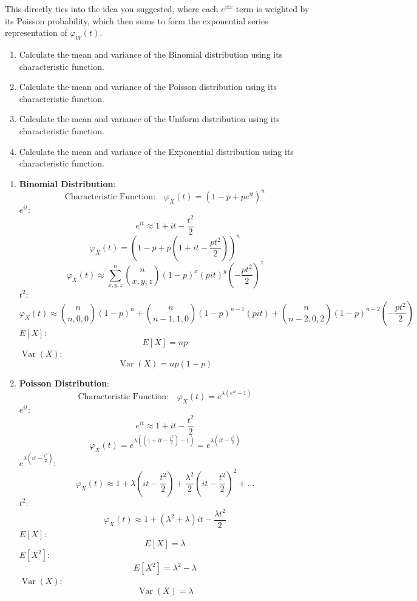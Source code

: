 \begin{enumerate}[label=(\alph*)]
This directly ties into the idea you suggested, where each \( e^{itx} \) term is weighted by its Poisson probability, which then sums to form the exponential series representation of \( \varphi_{W}(t) \).




\exercise
\exercise
\begin{enumerate}[label=(\alph*)]
    \item Calculate the mean and variance of the Binomial distribution using its characteristic function.
    \item Calculate the mean and variance of the Poisson distribution using its characteristic function.
    \item Calculate the mean and variance of the Uniform distribution using its characteristic function.
    \item Calculate the mean and variance of the Exponential distribution using its characteristic function.
\end{enumerate}

\solution
\begin{enumerate}[label=(\alph*)]
    \item
    \textbf{Binomial Distribution}:
    \[
    \text{Characteristic Function:} \quad \varphi_X(t) = (1-p + pe^{it})^n
    \]
     \( e^{it} \):
    \[
    e^{it} \approx 1 + it - \frac{t^2}{2}
    \]
    \[
    \varphi_X(t) = (1-p + p(1 + it - \frac{pt^2}{2}))^n
    \]
    \[
    \varphi_X(t) \approx \sum_{x,y,z}^n \binom{n}{x,y,z} (1-p)^x \left(pit\right)^y \left(-\frac{pt^2}{2}\right)^{z}
    \]
     \( t^2 \):
    \[
    \varphi_X(t) \approx \binom{n}{n,0,0}(1-p)^n + \binom{n}{n-1,1,0}(1-p)^{n-1}(pit) + \binom{n}{n-2,0,2}(1-p)^{n-2}\left(-\frac{pt^2}{2}\right)
    \]
     \( E[X] \):
    \[
    E[X] = np
    \]
     \( \operatorname{Var}(X) \):
    \[
    \operatorname{Var}(X) = np(1-p)
    \]

    \item
\textbf{Poisson Distribution}:
\[
\text{Characteristic Function:} \quad \varphi_X(t) = e^{\lambda (e^{it} - 1)}
\]
 \( e^{it} \):
\[
e^{it} \approx 1 + it - \frac{t^2}{2}
\]
\[
\varphi_X(t) = e^{\lambda \left((1 + it - \frac{t^2}{2}) - 1\right)} = e^{\lambda (it - \frac{t^2}{2})}
\]
 \( e^{\lambda (it - \frac{t^2}{2})} \):
\[
\varphi_X(t) \approx 1 + \lambda (it - \frac{t^2}{2}) + \frac{\lambda^2}{2} (it - \frac{t^2}{2})^2 + \ldots
\]
 \( t^2 \):
\[
\varphi_X(t) \approx 1 + (\lambda^2 + \lambda) it - \frac{\lambda t^2}{2}
\]
 \( E[X] \):
\[
E[X] = \lambda
\]
 \( E[X^2] \):
\[
E[X^2] = \lambda^2 - \lambda
\]
 \( \operatorname{Var}(X) \):
\[
\operatorname{Var}(X) = \lambda
\]



\end{enumerate}
\end{enumerate}
